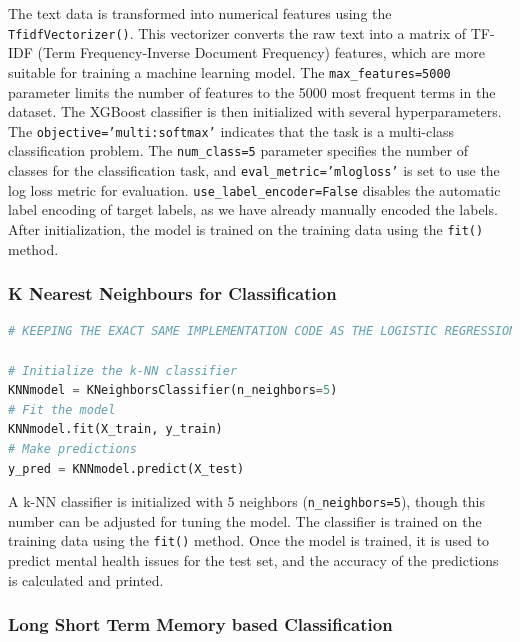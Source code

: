 \noindent
The text data is transformed into numerical features using the \texttt{TfidfVectorizer()}. This vectorizer converts the raw text into a matrix of TF-IDF (Term Frequency-Inverse Document Frequency) features, which are more suitable for training a machine learning model. The \texttt{max\_features=5000} parameter limits the number of features to the 5000 most frequent terms in the dataset. The XGBoost classifier is then initialized with several hyperparameters. The \texttt{objective='multi:softmax'} indicates that the task is a multi-class classification problem. The \texttt{num\_class=5} parameter specifies the number of classes for the classification task, and \texttt{eval\_metric='mlogloss'} is set to use the log loss metric for evaluation. \texttt{use\_label\_encoder=False} disables the automatic label encoding of target labels, as we have already manually encoded the labels. After initialization, the model is trained on the training data using the \texttt{fit()} method. 


\subsubsection{K Nearest Neighbours for Classification}

\begin{tcolorbox}[colback=gray!5!white, colframe=gray!80!black, boxrule=0.5pt, title=k-NN Classifier Implementation for Mental Health Classification]
    \begin{lstlisting}[language=Python]
# KEEPING THE EXACT SAME IMPLEMENTATION CODE AS THE LOGISTIC REGRESSION 

# Initialize the k-NN classifier
KNNmodel = KNeighborsClassifier(n_neighbors=5)  
# Fit the model
KNNmodel.fit(X_train, y_train)
# Make predictions
y_pred = KNNmodel.predict(X_test)
\end{lstlisting}
\end{tcolorbox}

\noindent
 A k-NN classifier is initialized with 5 neighbors (\texttt{n\_neighbors=5}), though this number can be adjusted for tuning the model. The classifier is trained on the training data using the \texttt{fit()} method. Once the model is trained, it is used to predict mental health issues for the test set, and the accuracy of the predictions is calculated and printed. 


\subsubsection{Long Short Term Memory based Classification}

